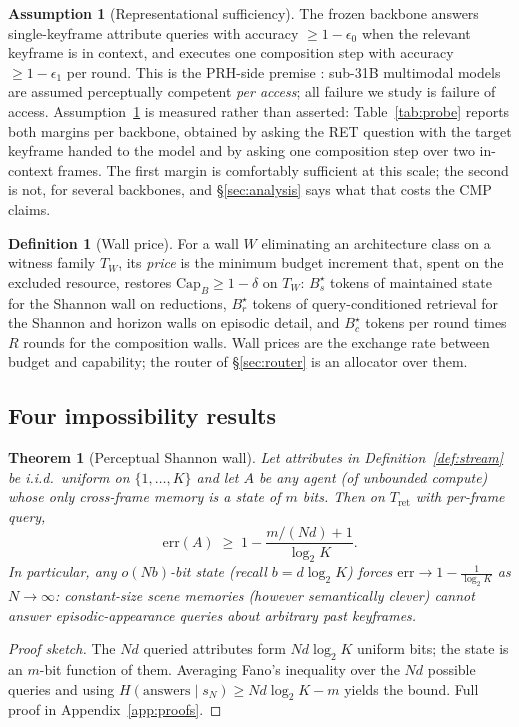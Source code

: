 \documentclass[10pt]{article}
\newtheorem{theorem}{Theorem}
\theoremstyle{definition}
\newtheorem{definition}{Definition}
\newtheorem{assumption}{Assumption}
\theoremstyle{plain}
\renewcommand{\Cap}{\mathrm{Cap}}
\newcommand{\err}{\mathrm{err}}
\begin{document}
\begin{assumption}[Representational sufficiency]
\label{ass:repr}
The frozen backbone answers single-keyframe attribute queries with accuracy $\ge 1-\epsilon_0$ when the relevant keyframe is in context, and executes one composition step with accuracy $\ge 1-\epsilon_1$ per round. This is the PRH-side premise \citep{prh}: sub-31B multimodal models are assumed perceptually competent \emph{per access}; all failure we study is failure of access. Assumption~\ref{ass:repr} is measured rather than asserted: Table~\ref{tab:probe} reports both margins per backbone, obtained by asking the RET question with the target keyframe handed to the model and by asking one composition step over two in-context frames. The first margin is comfortably sufficient at this scale; the second is not, for several backbones, and \S\ref{sec:analysis} says what that costs the CMP claims.
\end{assumption}

\begin{definition}[Wall price]
\label{def:price}
For a wall $W$ eliminating an architecture class on a witness family $T_W$, its \emph{price} is the minimum budget increment that, spent on the excluded resource, restores $\Cap_B\ge 1-\delta$ on $T_W$: $B_s^{\star}$ tokens of maintained state for the Shannon wall on reductions, $B_r^{\star}$ tokens of query-conditioned retrieval for the Shannon and horizon walls on episodic detail, and $B_c^{\star}$ tokens per round times $R$ rounds for the composition walls. Wall prices are the exchange rate between budget and capability; the router of \S\ref{sec:router} is an allocator over them.
\end{definition}

\subsection{Four impossibility results}

\begin{theorem}[Perceptual Shannon wall]
\label{thm:shannon}
Let attributes in Definition~\ref{def:stream} be i.i.d.\ uniform on $\{1,\dots,K\}$ and let $A$ be any agent (of unbounded compute) whose only cross-frame memory is a state of $m$ bits. Then on $T_{\mathrm{ret}}$ with per-frame query,
\[
\err(A)\;\ge\;1-\frac{m/(Nd)+1}{\log_2 K}.
\]
In particular, any $o(Nb)$-bit state (recall $b=d\log_2K$) forces $\err\to 1-\tfrac{1}{\log_2 K}$ as $N\to\infty$: constant-size scene memories (however semantically clever) cannot answer episodic-appearance queries about arbitrary past keyframes.
\end{theorem}
\begin{proof}[Proof sketch]
The $Nd$ queried attributes form $Nd\log_2 K$ uniform bits; the state is an $m$-bit function of them. Averaging Fano's inequality over the $Nd$ possible queries and using $H(\text{answers}\mid s_N)\ge Nd\log_2 K-m$ yields the bound. Full proof in Appendix~\ref{app:proofs}.
\end{proof}
\end{document}
